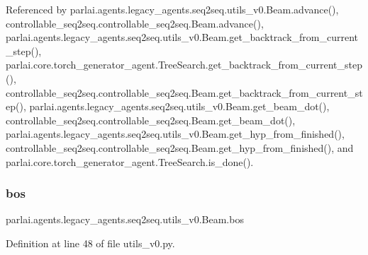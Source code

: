 Referenced by parlai.\+agents.\+legacy\+\_\+agents.\+seq2seq.\+utils\+\_\+v0.\+Beam.\+advance(), controllable\+\_\+seq2seq.\+controllable\+\_\+seq2seq.\+Beam.\+advance(), parlai.\+agents.\+legacy\+\_\+agents.\+seq2seq.\+utils\+\_\+v0.\+Beam.\+get\+\_\+backtrack\+\_\+from\+\_\+current\+\_\+step(), parlai.\+core.\+torch\+\_\+generator\+\_\+agent.\+Tree\+Search.\+get\+\_\+backtrack\+\_\+from\+\_\+current\+\_\+step(), controllable\+\_\+seq2seq.\+controllable\+\_\+seq2seq.\+Beam.\+get\+\_\+backtrack\+\_\+from\+\_\+current\+\_\+step(), parlai.\+agents.\+legacy\+\_\+agents.\+seq2seq.\+utils\+\_\+v0.\+Beam.\+get\+\_\+beam\+\_\+dot(), controllable\+\_\+seq2seq.\+controllable\+\_\+seq2seq.\+Beam.\+get\+\_\+beam\+\_\+dot(), parlai.\+agents.\+legacy\+\_\+agents.\+seq2seq.\+utils\+\_\+v0.\+Beam.\+get\+\_\+hyp\+\_\+from\+\_\+finished(), controllable\+\_\+seq2seq.\+controllable\+\_\+seq2seq.\+Beam.\+get\+\_\+hyp\+\_\+from\+\_\+finished(), and parlai.\+core.\+torch\+\_\+generator\+\_\+agent.\+Tree\+Search.\+is\+\_\+done().

\mbox{\label{classparlai_1_1agents_1_1legacy__agents_1_1seq2seq_1_1utils__v0_1_1Beam_abae3db8ae23e5e334edceeeaf6bd4517}} 
\subsubsection{\texorpdfstring{bos}{bos}}
{\footnotesize\ttfamily parlai.\+agents.\+legacy\+\_\+agents.\+seq2seq.\+utils\+\_\+v0.\+Beam.\+bos}



Definition at line 48 of file utils\+\_\+v0.\+py.

\mbox{\label{classparlai_1_1agents_1_1legacy__agents_1_1seq2seq_1_1utils__v0_1_1Beam_a5bc1b513284975d51d9ec9554fa29f94}} 

